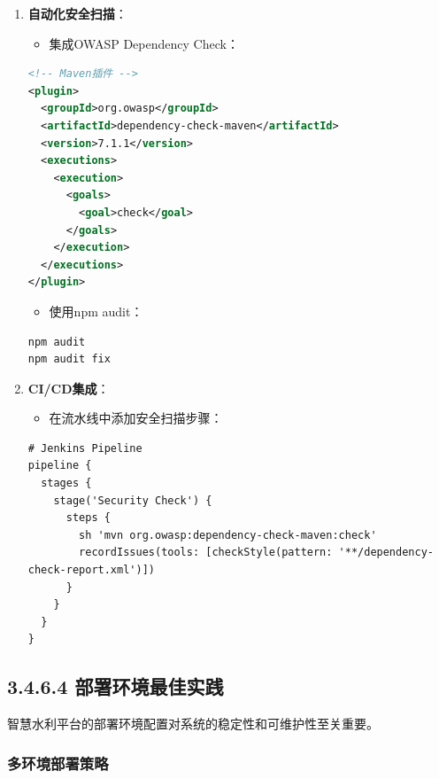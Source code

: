 \begin{enumerate}
\def\labelenumi{\arabic{enumi}.}
\tightlist
\item
  \textbf{自动化安全扫描}：

  \begin{itemize}
  \tightlist
  \item
    集成OWASP Dependency Check：
  \end{itemize}

\begin{lstlisting}[language=XML]
<!-- Maven插件 -->
<plugin>
  <groupId>org.owasp</groupId>
  <artifactId>dependency-check-maven</artifactId>
  <version>7.1.1</version>
  <executions>
    <execution>
      <goals>
        <goal>check</goal>
      </goals>
    </execution>
  </executions>
</plugin>
\end{lstlisting}

  \begin{itemize}
  \tightlist
  \item
    使用npm audit：
  \end{itemize}

\begin{lstlisting}[language=bash]
npm audit
npm audit fix
\end{lstlisting}
\item
  \textbf{CI/CD集成}：

  \begin{itemize}
  \tightlist
  \item
    在流水线中添加安全扫描步骤：
  \end{itemize}

\begin{lstlisting}
# Jenkins Pipeline
pipeline {
  stages {
    stage('Security Check') {
      steps {
        sh 'mvn org.owasp:dependency-check-maven:check'
        recordIssues(tools: [checkStyle(pattern: '**/dependency-check-report.xml')])
      }
    }
  }
}
\end{lstlisting}
\end{enumerate}

\subsection{3.4.6.4
部署环境最佳实践}\label{ux90e8ux7f72ux73afux5883ux6700ux4f73ux5b9eux8df5}

智慧水利平台的部署环境配置对系统的稳定性和可维护性至关重要。

\subsubsection{多环境部署策略}\label{ux591aux73afux5883ux90e8ux7f72ux7b56ux7565}

